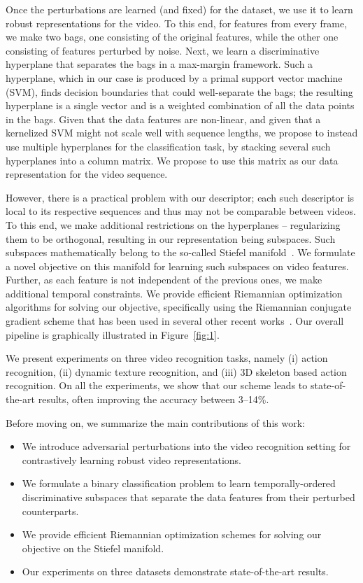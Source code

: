 \documentclass[runningheads]{llncs}
\begin{document}
Once the perturbations are learned (and fixed) for the dataset, we use it to learn robust representations for the video. To this end, for features from every frame, we make two bags, one consisting of the original features, while the other one consisting of features perturbed by noise. Next, we learn a discriminative hyperplane that separates the bags in a max-margin framework. Such a hyperplane, which in our case is produced by a primal support vector machine (SVM), finds decision boundaries that could well-separate the bags; the resulting hyperplane is a single vector and is a weighted combination of all the data points in the bags. Given that the data features are non-linear, and given that a kernelized SVM might not scale well with sequence lengths, we propose to instead use multiple hyperplanes for the classification task, by stacking several such hyperplanes into a column matrix. We propose to use this matrix as our data representation for the video sequence. 

However, there is a practical problem with our descriptor; each such descriptor is local to its respective sequences and thus may not be comparable between videos. To this end, we make additional restrictions on the hyperplanes -- regularizing them to be orthogonal, resulting in our representation being subspaces. Such subspaces mathematically belong to the so-called Stiefel manifold~\cite{boothby1986introduction}. We formulate a novel objective on this manifold for learning such subspaces on video features.  Further, as each feature is not independent of the previous ones, we make additional temporal constraints. We provide efficient Riemannian optimization algorithms for solving our objective, specifically using the Riemannian conjugate gradient scheme that has been used in several other recent works~\cite{grp,harandi2014manifold,huang2015projection}. Our overall pipeline is graphically illustrated in Figure~\ref{fig:1}.

We present experiments on three video recognition tasks, namely (i) action recognition, (ii) dynamic texture recognition, and (iii) 3D skeleton based action recognition. On all the experiments, we show that our scheme leads to state-of-the-art results, often improving the accuracy between 3--14\%.

Before moving on, we summarize the main contributions of this work:
\begin{itemize}
\item We introduce adversarial perturbations into the video recognition setting for contrastively learning robust video representations. 
\item We formulate a binary classification problem to learn temporally-ordered discriminative subspaces that separate the data features from their perturbed counterparts.
\item We provide efficient Riemannian optimization schemes for solving our objective on the Stiefel manifold.
\item Our experiments on three datasets demonstrate state-of-the-art results.
\end{itemize}
\end{document}
